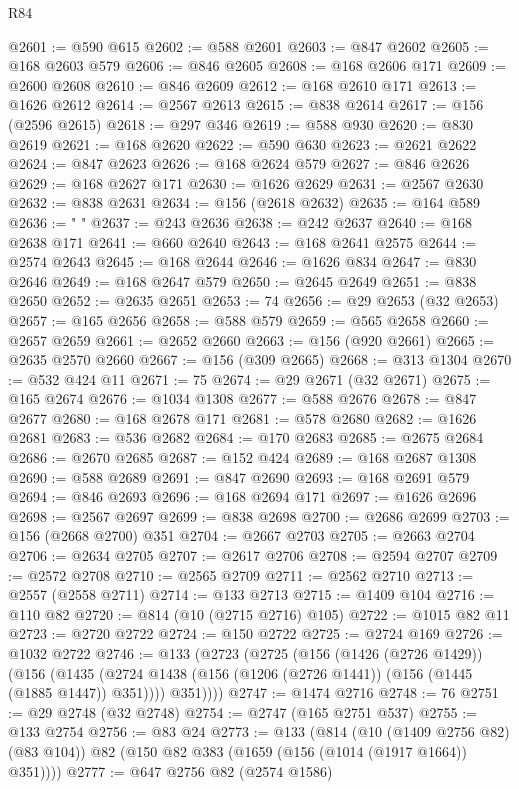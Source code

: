 \begin{lexlean}{R84}
\begin{coremodule}
@2601 := @590 @615
@2602 := @588 @2601
@2603 := @847 @2602
@2605 := @168 @2603 @579
@2606 := @846 @2605
@2608 := @168 @2606 @171
@2609 := @2600 @2608
@2610 := @846 @2609
@2612 := @168 @2610 @171
@2613 := @1626 @2612
@2614 := @2567 @2613
@2615 := @838 @2614
@2617 := @156 (@2596 @2615)
@2618 := @297 @346
@2619 := @588 @930
@2620 := @830 @2619
@2621 := @168 @2620
@2622 := @590 @630
@2623 := @2621 @2622
@2624 := @847 @2623
@2626 := @168 @2624 @579
@2627 := @846 @2626
@2629 := @168 @2627 @171
@2630 := @1626 @2629
@2631 := @2567 @2630
@2632 := @838 @2631
@2634 := @156 (@2618 @2632)
@2635 := @164 @589
@2636 := " "
@2637 := @243 @2636
@2638 := @242 @2637
@2640 := @168 @2638 @171
@2641 := @660 @2640
@2643 := @168 @2641 @2575
@2644 := @2574 @2643
@2645 := @168 @2644
@2646 := @1626 @834
@2647 := @830 @2646
@2649 := @168 @2647 @579
@2650 := @2645 @2649
@2651 := @838 @2650
@2652 := @2635 @2651
@2653 := 74
@2656 := @29 @2653 (@32 @2653)
@2657 := @165 @2656
@2658 := @588 @579
@2659 := @565 @2658
@2660 := @2657 @2659
@2661 := @2652 @2660
@2663 := @156 (@920 @2661)
@2665 := @2635 @2570 @2660
@2667 := @156 (@309 @2665)
@2668 := @313 @1304
@2670 := @532 @424 @11
@2671 := 75
@2674 := @29 @2671 (@32 @2671)
@2675 := @165 @2674
@2676 := @1034 @1308
@2677 := @588 @2676
@2678 := @847 @2677
@2680 := @168 @2678 @171
@2681 := @578 @2680
@2682 := @1626 @2681
@2683 := @536 @2682
@2684 := @170 @2683
@2685 := @2675 @2684
@2686 := @2670 @2685
@2687 := @152 @424
@2689 := @168 @2687 @1308
@2690 := @588 @2689
@2691 := @847 @2690
@2693 := @168 @2691 @579
@2694 := @846 @2693
@2696 := @168 @2694 @171
@2697 := @1626 @2696
@2698 := @2567 @2697
@2699 := @838 @2698
@2700 := @2686 @2699
@2703 := @156 (@2668 @2700) @351
@2704 := @2667 @2703
@2705 := @2663 @2704
@2706 := @2634 @2705
@2707 := @2617 @2706
@2708 := @2594 @2707
@2709 := @2572 @2708
@2710 := @2565 @2709
@2711 := @2562 @2710
@2713 := @2557 (@2558 @2711)
@2714 := @133 @2713
@2715 := @1409 @104
@2716 := @110 @82
@2720 := @814 (@10 (@2715 @2716) @105)
@2722 := @1015 @82 @11
@2723 := @2720 @2722
@2724 := @150 @2722
@2725 := @2724 @169
@2726 := @1032 @2722
@2746 := @133
    (@2723
      (@2725
        (@156
          (@1426 (@2726 @1429))
          (@156
            (@1435 (@2724 @1438 (@156 (@1206 (@2726 @1441)) (@156 (@1445 (@1885 @1447)) @351))))
            @351))))
@2747 := @1474 @2716
@2748 := 76
@2751 := @29 @2748 (@32 @2748)
@2754 := @2747 (@165 @2751 @537)
@2755 := @133 @2754
@2756 := @83 @24
@2773 := @133
    (@814
      (@10 (@1409 @2756 @82) (@83 @104))
      @82
      (@150 @82 @383 (@1659 (@156 (@1014 (@1917 @1664)) @351))))
@2777 := @647 @2756 @82 (@2574 @1586)

\end{coremodule}
\end{lexlean}
